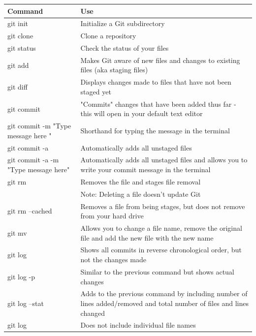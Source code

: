 \documentclass{article} %
\begin{document}
\begin{center}
    \begin{tabular}{ | l | p{7cm} |}
    \hline
    Command & Use \\ \hline
    git \color{blue}init & Initialize a Git subdirectory \\ 
    git \color{blue}clone & Clone a repository \\ 
    git \color{blue}status & Check the status of your files  \\
    
    git \color{blue}add & Makes Git aware of new files and changes to existing files (aka staging files)  \\
    
    git \color{blue}diff & Displays changes made to files that have not been staged yet  \\
    
    git \color{blue}commit & "Commits" changes that have been added thus far - this will open in your default text editor \\ 
    git \color{blue}commit -m "Type message here " & Shorthand for typing the message in the terminal \\ 
    git \color{blue} commit  -a & Automatically adds all unstaged files \\
    git \color{blue} commit -a -m "Type message here"  & Automatically adds all unstaged files and allows you to write your commit message in the terminal \\
    git \color{blue}rm  & Removes the file and stages file removal \\
    				& Note: Deleting a file doesn't update Git \\   
    git \color{blue}rm --cached & Removes a file from being stages, but does not remove from your hard drive\\ 
    git \color{blue}mv & Allows you to change a file name, remove the original file and add the new file with the new name \\ 
    git \color{blue}log & Shows all commits in reverse chronological order, but not the changes made \\
    git \color{blue}log -p & Similar to the previous command but shows actual changes \\
    git \color{blue}log --stat & Adds to the previous command by including number of lines added/removed and total number of files and lines changed \\
    git \color{blue}log & Does not include individual file names \\ 
    
    \end{tabular}
\end{center}
\end{document}
